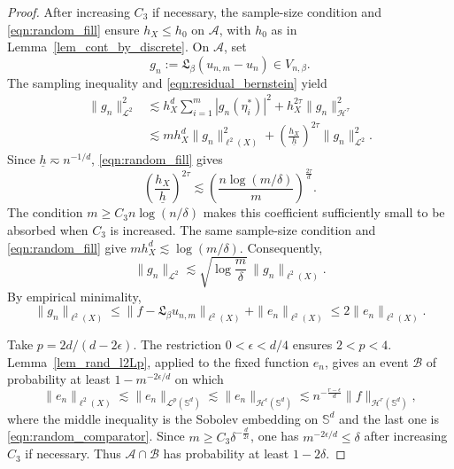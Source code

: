 \documentclass{article}
\numberwithin{equation}{section}
\def\SS{\mathbb{S}}
\def\sul{\sum\limits}
\begin{document}
\begin{proof}
After increasing $C_3$ if necessary, the sample-size condition and \eqref{eqn:random_fill} ensure $h_X\leq h_0$ on $\mathcal A$, with $h_0$ as in Lemma~\ref{lem_cont_by_discrete}. On $\mathcal A$, set
\begin{equation*}
g_n:=\mathfrak L_\beta(u_{n,m}-u_n)\in V_{n,\beta}.
\end{equation*}
The sampling inequality and \eqref{eqn:residual_bernstein} yield
\begin{equation}
\begin{split}
\|g_n\|_{\mathcal L^2}^2
&\lesssim h_X^d\sul_{i=1}^m|g_n(\eta_i^*)|^2+h_X^{2\tau}\|g_n\|_{\mathcal H^\tau}^2\\
&\lesssim mh_X^d\|g_n\|_{\ell^2(X)}^2+\left(\frac{h_X}{\underline h}\right)^{2\tau}\|g_n\|_{\mathcal L^2}^2.
\end{split}
\end{equation}
Since $\underline h\eqsim n^{-1/d}$, \eqref{eqn:random_fill} gives
\begin{equation*}
\left(\frac{h_X}{\underline h}\right)^{2\tau}
\lesssim\left(\frac{n\log(m/\delta)}{m}\right)^{\frac{2\tau}{d}}.
\end{equation*}
The condition $m\geq C_3n\log(n/\delta)$ makes this coefficient sufficiently small to be absorbed when $C_3$ is increased. The same sample-size condition and \eqref{eqn:random_fill} give $mh_X^d\lesssim\log(m/\delta)$. Consequently,
\begin{equation}\label{eqn:random_stability}
\|g_n\|_{\mathcal L^2}\lesssim\sqrt{\log\frac m\delta}\,\|g_n\|_{\ell^2(X)}.
\end{equation}
By empirical minimality,
\begin{equation}\label{eqn:random_minimality}
\|g_n\|_{\ell^2(X)}\leq\|f-\mathfrak L_\beta u_{n,m}\|_{\ell^2(X)}+\|e_n\|_{\ell^2(X)}\leq2\|e_n\|_{\ell^2(X)}.
\end{equation}

Take $p=2d/(d-2\epsilon)$. The restriction $0<\epsilon<d/4$ ensures $2<p<4$. Lemma~\ref{lem_rand_l2Lp}, applied to the fixed function $e_n$, gives an event $\mathcal B$ of probability at least $1-m^{-2\epsilon/d}$ on which
\begin{equation}
\|e_n\|_{\ell^2(X)}\lesssim\|e_n\|_{\mathcal L^p(\SS^d)}\lesssim\|e_n\|_{\mathcal H^\epsilon(\SS^d)}\lesssim n^{-\frac{r-\epsilon}{d}}\|f\|_{\mathcal H^r(\SS^d)},
\end{equation}
where the middle inequality is the Sobolev embedding on $\SS^d$ and the last one is \eqref{eqn:random_comparator}. Since $m\geq C_3\delta^{-\frac{d}{2\epsilon}}$, one has $m^{-2\epsilon/d}\leq\delta$ after increasing $C_3$ if necessary. Thus $\mathcal A\cap\mathcal B$ has probability at least $1-2\delta$.


\end{proof}
\end{document}
